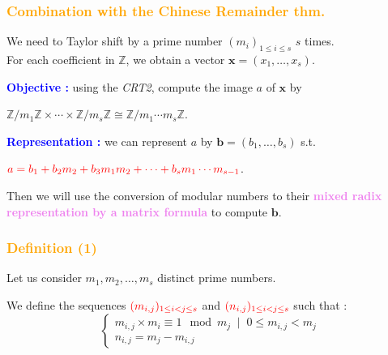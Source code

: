 \begin{frame}[fragile]
\frametitle{\textbf{\textcolor{orange}{Combination with the Chinese Remainder thm.}}}

\begin{block}{}
We need to Taylor shift by a prime number $(m_i)_{1 \leq i \leq s}$ $s$ times.\\
For each coefficient in $\mathbb{Z}$, we obtain a vector $\textbf{x} = (x_1,\dots,x_s)$.
\end{block}

\begin{block}{}
\textcolor{blue}{\textbf{Objective :}} using the \textit{CRT2}, compute the image $a$ of $\mathbf{x}$ by
\begin{center}
$\mathbb{Z}/m_1\mathbb{Z} \times \cdots \times \mathbb{Z}/m_s\mathbb{Z} \cong \mathbb{Z}/m_1\cdots m_s\mathbb{Z}$.\\
\end{center}
\vspace{3mm}
\textcolor{blue}{\textbf{Representation :}} we can represent $a$ by $\textbf{b} = (b_1,\dots,b_s)$ s.t.
\begin{center}
$\textcolor{red}{a = b_1 + b_2m_2 + b_3m_1m_2 + \cdots + b_sm_1\cdots m_{s-1}}$.
\end{center}
\end{block}

Then we will use the conversion of modular numbers to their \textcolor{violet}{\textbf{mixed radix representation by a matrix formula}} to compute $\textbf{b}$.

\end{frame}

\begin{frame}[fragile]
\frametitle{\textbf{\textcolor{orange}{Definition (1)}}}

Let us consider $m_1, m_2,\dots,m_s$ distinct prime numbers.

\begin{Definition}[$(m_{i,j})$ and $(n_{i,j})$]
We define the sequences $\textcolor{red}{(m_{i,j})_{1 \leq i < j \leq s}}$ and $\textcolor{red}{(n_{i,j})_{1 \leq i < j \leq s}}$ such that :
$$\left\{
\begin{array}{l}
m_{i,j}\times m_i \equiv 1\mod m_j \;\; | \;\; 0 \leq m_{i,j} < m_j\\
n_{i,j} = m_j - m_{i,j}
\end{array}
\right.$$
\end{Definition}

\end{frame}

